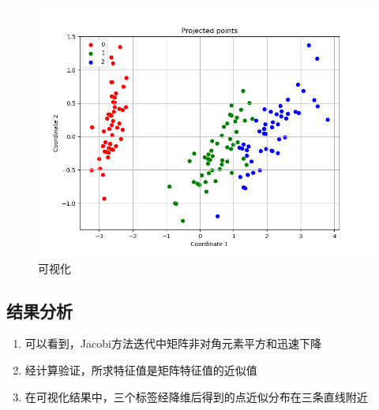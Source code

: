\documentclass[UTF8]{ctexart}
\begin{document}
\begin{figure}[H]
  \centering
  \includegraphics[scale=0.5]{result.png}
  \caption{可视化}
\end{figure}
\subsection{结果分析}
\begin{enumerate}
  \item 可以看到，Jacobi方法迭代中矩阵非对角元素平方和迅速下降
  \item 经计算验证，所求特征值是矩阵特征值的近似值
  \item 在可视化结果中，三个标签经降维后得到的点近似分布在三条直线附近
\end{enumerate}



\end{document}

